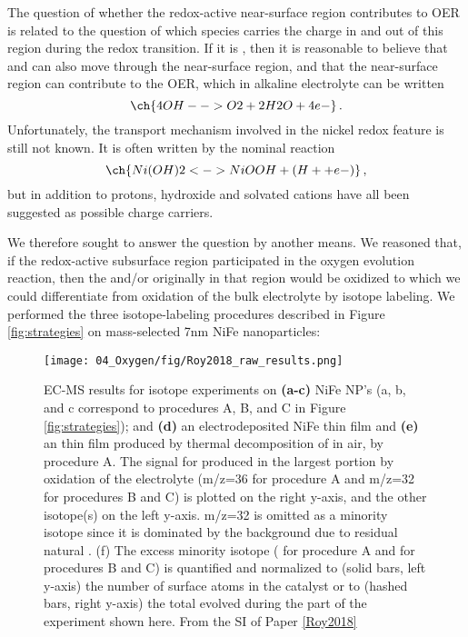 The question of whether the redox-active near-surface region contributes to OER is related to the question of which species carries the charge in and out of this region during the redox transition. If it is , then it is reasonable to believe that  and  can also move through the near-surface region, and that the near-surface region can contribute to the OER, which in alkaline electrolyte can be written
\begin{equation}
\ch{4 OH- -> O2 + 2 H2O + 4 e-}\,.\label{rxn:OER_alkaline}
\end{equation}
Unfortunately, the transport mechanism involved in the nickel redox feature is still not known\cite{Dionigi2016b}. It is often written by the nominal reaction 
\begin{equation}
\ch{Ni(OH)2 <-> NiOOH + (H+ + e- )}\,,\label{rxn:Ni_redox}
\end{equation}
but in addition to protons, hydroxide and solvated cations have all been suggested as possible charge carriers\cite{WehrensDijksma2006}.

We therefore sought to answer the question by another means. We reasoned that, if the redox-active subsurface region participated in the oxygen evolution reaction, then the  and/or  originally in that region would be oxidized to  which we could differentiate from oxidation of the bulk electrolyte by isotope labeling. We performed the three isotope-labeling procedures described in Figure \ref{fig:strategies} on mass-selected 7nm NiFe nanoparticles:


\begin{figure}[p]
	\centering
	\texttt{[image: 04\_Oxygen/fig/Roy2018\_raw\_results.png]}
	\caption{EC-MS results for isotope experiments on \textbf{(a-c)} NiFe NP’s (a, b, and c correspond to procedures A, B, and C in Figure \ref{fig:strategies}); and \textbf{(d)} an electrodeposited NiFe thin film and \textbf{(e)} an  thin film produced by thermal decomposition of  in air, by procedure A. The signal for  produced in the largest portion by oxidation of the electrolyte (m/z=36 for procedure A and m/z=32 for procedures B and C) is plotted on the right y-axis, and the other  isotope(s) on the left y-axis. m/z=32 is omitted as a minority isotope since it is dominated by the background due to residual natural . (f) The excess minority isotope ( for procedure A and  for procedures B and C) is quantified and normalized to (solid bars, left y-axis) the number of surface atoms in the catalyst or to (hashed bars, right y-axis) the total  evolved during the part of the experiment shown here. From the SI of Paper \ref{Roy2018}}
	\label{fig:Roy2018_raw_results}
\end{figure}

